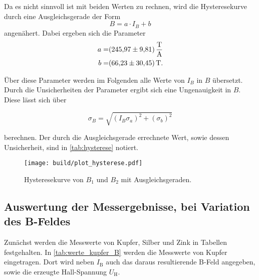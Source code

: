 Da es nicht sinnvoll ist mit beiden Werten zu rechnen, wird die Hysteresekurve durch eine Ausgleichsgerade der Form
\begin{equation}
    B = a \cdot I_B + b
    \label{eq:gerade}
\end{equation}
angenähert.
Dabei ergeben sich die Parameter
\begin{align}
    a =& \SI{245.97+-9.81}{\tesla\per\ampere} \\
    b =& \SI{66.23+-30.45}{\tesla}.
    \label{eq:params1}
\end{align}

Über diese Parameter werden im Folgenden alle Werte von $I_B$ in $B$ übersetzt.
Durch die Unsicherheiten der Parameter ergibt sich eine Ungenauigkeit in $B$.
Diese lässt sich über

\begin{equation}
    \sigma _B = \sqrt{\left(I_B \sigma _a \right)^2 + \left(\sigma _b \right)^2}
    \label{eq:B_fehler}
\end{equation}

berechnen.
Der durch die Ausgleichsgerade errechnete Wert, sowie dessen Unsicherheit, sind in \autoref{tab:hysterese} notiert.

\begin{figure}
    \centering
    \texttt{[image: build/plot\_hysterese.pdf]}
    \caption{Hysteresekurve von $B_1$ und $B_2$ mit Ausgleichsgeraden.\cite{numpy}}
    \label{fig:hysterese_plot}
\end{figure}

\subsection{Auswertung der Messergebnisse, bei Variation des B-Feldes}
\label{ssec:mess}

Zunächst werden die Messwerte von Kupfer, Silber und Zink in Tabellen festgehalten.
In \autoref{tab:werte_kupfer_B} werden die Messwerte von Kupfer eingetragen.
Dort wird neben $I_\text{B}$ auch das daraus resultierende B-Feld angegeben, sowie die erzeugte Hall-Spannung $U_\text{H}$.

